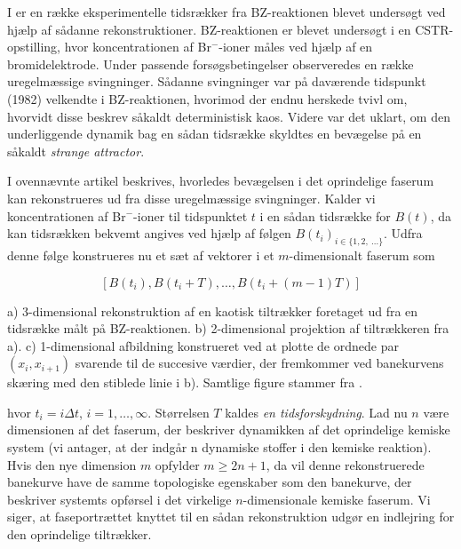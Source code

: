 \vspace{4.0mm}
I \cite{Swinney} er en r{\ae}kke eksperimentelle
tidsr{\ae}kker fra BZ-reaktionen blevet unders{\o}gt ved
hj{\ae}lp af s{\aa}danne rekonstruktioner. BZ-reaktionen er
blevet unders{\o}gt i en CSTR-opstilling, hvor
koncentrationen af Br$^-$-ioner m{\aa}les ved hj{\ae}lp af
en bromidelektrode. Under passende fors{\o}gsbetingelser
observeredes en r{\ae}kke uregelm{\ae}ssige svingninger.
S{\aa}danne svingninger var p{\aa} dav{\ae}rende tidspunkt
(1982) velkendte i BZ-reaktionen, hvorimod der endnu
herskede tvivl om, hvorvidt disse beskrev s{\aa}kaldt
deterministisk kaos. Videre var det uklart, om den
underliggende dynamik bag en s{\aa}dan tidsr{\ae}kke
skyldtes en bev{\ae}gelse p{\aa} en s{\aa}kaldt {\em
strange attractor\/}.

\vspace{4.0mm}
I ovenn{\ae}vnte artikel beskrives, hvorledes
bev{\ae}gelsen i det oprindelige faserum kan rekonstrueres
ud fra disse uregelm{\ae}ssige svingninger. Kalder vi
koncentrationen af Br$^-$-ioner til tidspunktet $t$ i en
s{\aa}dan tidsr{\ae}kke for $B(t)$, da kan tidsr{\ae}kken bekvemt
angives ved hj{\ae}lp af f{\o}lgen $B(t_i)_{i \in \{ 1,2,\:
\ldots \} }$. Udfra denne f{\o}lge konstrueres nu et
s{\ae}t af vektorer i et $m$-dimensionalt faserum som

\begin{equation}
  \left[ B(t_i), B(t_i+T), \ldots, B(t_i + (m-1)T) \right]
  \label{eq:ReconVector}
\end{equation}

{
 \vspace{12cm}
}
{
\caption{\protect\capsize
a) 3-dimensional rekonstruktion af en kaotisk
tiltr{\ae}kker foretaget ud fra en tidsr{\ae}kke m{\aa}lt
p{\aa} BZ-reaktionen. b) 2-dimensional projektion af
tiltr{\ae}kkeren fra a). c) 1-dimensional afbildning
konstrueret ved at plotte de ordnede par $(x_i,x_{i+1})$
svarende til de succesive v{\ae}rdier, der fremkommer ved
banekurvens sk{\ae}ring med den stiblede linie i b).
Samtlige figure stammer fra \protect\cite{Swinney}.
}
\label{fig:PoincarePlots}
}

hvor $t_i = i \Delta t$, $i = 1, \ldots, \infty$.
St{\o}rrelsen $T$ kaldes {\em en tidsforskydning\/}. Lad nu
$n$ v{\ae}re dimensionen af det faserum, der beskriver
dynamikken af det oprindelige kemiske system (vi antager,
at der indg{\aa}r n dynamiske stoffer i den kemiske
reaktion). Hvis den nye dimension $m$ opfylder $m \geq
2n+1$, da vil denne rekonstruerede banekurve have de samme
topologiske egenskaber som den banekurve, der beskriver
systemts opf{\o}rsel i det virkelige $n$-dimensionale
kemi\-ske faserum. Vi siger, at faseportr{\ae}ttet knyttet
til en s{\aa}dan rekonstruktion udg{\o}r en indlej\-ring
for den oprindelige tiltr{\ae}kker.

